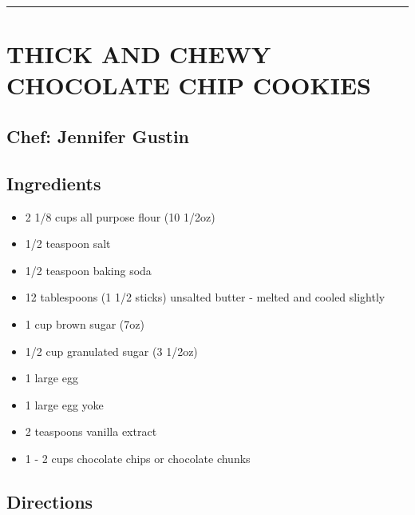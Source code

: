 \documentclass[
]{book}
\providecommand{\tightlist}{%
  \setlength{\itemsep}{0pt}\setlength{\parskip}{0pt}}
\begin{document}
\begin{center}\rule{0.5\linewidth}{0.5pt}\end{center}

\hypertarget{thick-and-chewy-chocolate-chip-cookies}{%
\section*{THICK AND CHEWY CHOCOLATE CHIP COOKIES}\label{thick-and-chewy-chocolate-chip-cookies}}


\hypertarget{chef-jennifer-gustin-13}{%
\subsection*{Chef: Jennifer Gustin}\label{chef-jennifer-gustin-13}}


\hypertarget{ingredients-107}{%
\subsection*{Ingredients}\label{ingredients-107}}


\begin{itemize}
\tightlist
\item
  2 1/8 cups all purpose flour (10 1/2oz)
\item
  1/2 teaspoon salt
\item
  1/2 teaspoon baking soda
\item
  12 tablespoons (1 1/2 sticks) unsalted butter - melted and cooled slightly
\item
  1 cup brown sugar (7oz)
\item
  1/2 cup granulated sugar (3 1/2oz)
\item
  1 large egg
\item
  1 large egg yoke
\item
  2 teaspoons vanilla extract
\item
  1 - 2 cups chocolate chips or chocolate chunks
\end{itemize}

\hypertarget{directions-107}{%
\subsection*{Directions}\label{directions-107}}
\end{document}
